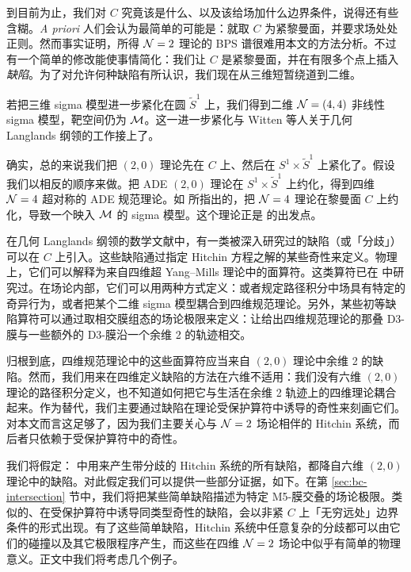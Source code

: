 到目前为止，我们对 $C$ 究竟该是什么、以及该给场加什么边界条件，说得还有些含糊。\emph{A priori} 人们会认为最简单的可能是：就取 $C$ 为紧黎曼面，并要求场处处正则。然而事实证明，所得 $\mathcal{N}=2$ 理论的 BPS 谱很难用本文的方法分析。不过有一个简单的修改能使事情简化：我们让 $C$ 是紧黎曼面，并在有限多个点上插入\emph{缺陷}。为了对允许何种缺陷有所认识，我们现在从三维短暂绕道到二维。

若把三维 sigma 模型进一步紧化在圆 $\tilde S^1$ 上，我们得到二维 $\mathcal{N} = (4,4)$ 非线性 sigma 模型，靶空间仍为 $\mathcal{M}$。这一进一步紧化与 Witten 等人关于几何 Langlands 纲领的工作\cite{geom-lang-n4,Gukov:2006jk,Frenkel:2007tx}接上了。

确实，总的来说我们把 $(2,0)$ 理论先在 $C$ 上、然后在 $S^1 \times \tilde S^1$ 上紧化了。假设我们以相反的顺序来做。把 ADE $(2,0)$ 理论在 $S^1 \times \tilde S^1$ 上约化，得到四维 $\mathcal{N}=4$ 超对称的 ADE 规范理论。如 \cite{Harvey:1995tg,Bershadsky:1995vm} 所指出的，把 $\mathcal{N}=4$ 理论在黎曼面 $C$ 上约化，导致一个映入 $\mathcal{M}$ 的 sigma 模型。这个理论正是 \cite{geom-lang-n4,Gukov:2006jk,Frenkel:2007tx} 的出发点。

在几何 Langlands 纲领的数学文献中，有一类被深入研究过的缺陷（或「分歧」）可以在 $C$ 上引入。这些缺陷通过指定 Hitchin 方程之解的某些奇性来定义。物理上，它们可以解释为来自四维超 Yang–Mills 理论中的面算符。这类算符已在 \cite{Gukov:2006jk} 中研究过。在场论内部，它们可以用两种方式定义：或者规定路径积分中场具有特定的奇异行为，或者把某个二维 sigma 模型耦合到四维规范理论。另外，某些初等缺陷算符可以通过取相交膜组态的场论极限来定义：让给出四维规范理论的那叠 D3-膜与一些额外的 D3-膜沿一个余维 2 的轨迹相交。

归根到底，四维规范理论中的这些面算符应当来自 $(2,0)$ 理论中余维 2 的缺陷。然而，我们用来在四维定义缺陷的方法在六维不适用：我们没有六维 $(2,0)$ 理论的路径积分定义，也不知道如何把它与生活在余维 2 轨迹上的四维理论耦合起来。作为替代，我们主要通过缺陷在理论受保护算符中诱导的奇性来刻画它们。对本文而言这足够了，因为我们主要关心与 $\mathcal{N}=2$ 场论相伴的 Hitchin 系统，而后者只依赖于受保护算符中的奇性。

我们将假定：\cite{Gukov:2006jk,Witten:2007td} 中用来产生带分歧的 Hitchin 系统的所有缺陷，都降自六维 $(2,0)$ 理论中的缺陷。对此假定我们可以提供一些部分证据，如下。在第 \ref{sec:bc-intersection} 节中，我们将把某些简单缺陷描述为特定 M5-膜交叠的场论极限。类似的、在受保护算符中诱导同类型奇性的缺陷，会以非紧 $C$ 上「无穷远处」边界条件的形式出现。有了这些简单缺陷，Hitchin 系统中任意复杂的分歧都可以由它们的碰撞以及其它极限程序产生，而这些在四维 $\mathcal{N}=2$ 场论中似乎有简单的物理意义。正文中我们将考虑几个例子。

